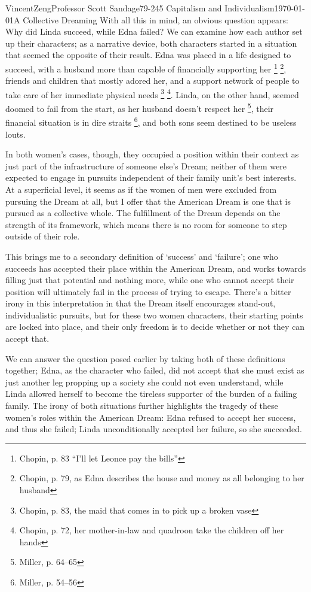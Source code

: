 \documentclass[12pt]{article}
\begin{document}
\begin{mla}{Vincent}{Zeng}{Professor Scott Sandage}{79-245 Capitalism and Individualism}{\today}{A Collective Dreaming}
With all this in mind, an obvious question appears: Why did Linda succeed,
while Edna failed?  We can examine how each author set up their characters; as
a narrative device, both characters started in a situation that seemed the
opposite of their result.  Edna was placed in a life designed to succeed, with
a husband more than capable of financially supporting her \footnote{Chopin,
p. 83 ``I'll let Leonce pay the bills''} \footnote{Chopin, p. 79, as Edna
describes the house and money as all belonging to her husband}, friends and
children that mostly adored her, and a support network of people to take care
of her immediate physical needs \footnote{Chopin, p. 83, the maid that comes
in to pick up a broken vase} \footnote{Chopin, p. 72, her mother-in-law and
quadroon take the children off her hands}. Linda, on the other hand, seemed
doomed to fail from the start, as her husband doesn't respect her
\footnote{Miller, p. 64--65}, their financial situation is in dire straits
\footnote{Miller, p. 54--56}, and both sons seem destined to be useless louts.

In both women's cases, though, they occupied a position within their context
as just part of the infrastructure of someone else's Dream; neither of them
were expected to engage in pursuits independent of their family unit's
best interests. At a superficial level, it seems as if the women of men were
excluded from pursuing the Dream at all, but I offer that the American Dream
is one that is pursued as a collective whole. The fulfillment of the Dream
depends on the strength of its framework, which means there is no room for
someone to step outside of their role.

This brings me to a secondary definition of `success' and `failure'; one who
succeeds has accepted their place within the American Dream, and works towards
filling just that potential and nothing more, while one who cannot accept
their position will ultimately fail in the process of trying to escape.
There's a bitter irony in this interpretation in that the Dream itself
encourages stand-out, individualistic pursuits, but for these two women
characters, their starting points are locked into place, and their only
freedom is to decide whether or not they can accept that.

We can answer the question posed earlier by taking both of these definitions
together; Edna, as the character who failed, did not accept that she must
exist as just another leg propping up a
society she could not even understand, while Linda allowed herself to become
the tireless supporter of the burden of a failing family. The irony of both
situations further highlights the tragedy of these women's roles within the
American Dream: Edna refused to accept her success, and thus she
failed; Linda unconditionally accepted her failure, so she succeeded.


\end{mla}
\end{document}
